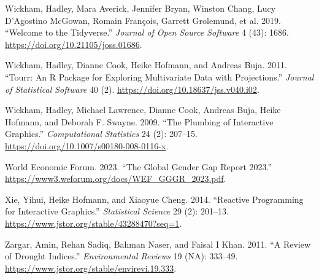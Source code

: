 \documentclass[
]{interact}
\newlength{\cslhangindent}
\newlength{\cslentryspacingunit} %
\newenvironment{CSLReferences}[2] %
 {%
  \setlength{\parindent}{0pt}
  \ifodd #1
  \let\oldpar\par
  \def\par{\hangindent=\cslhangindent\oldpar}
  \fi
  \setlength{\parskip}{#2\cslentryspacingunit}
 }%
 {}
\begin{document}
\begin{CSLReferences}{1}{0}
\leavevmode{}%
Wickham, Hadley, Mara Averick, Jennifer Bryan, Winston Chang, Lucy
D'Agostino McGowan, Romain François, Garrett Grolemund, et al. 2019.
{``Welcome to the {Tidyverse}.''} \emph{Journal of Open Source Software}
4 (43): 1686. \url{https://doi.org/10.21105/joss.01686}.

\leavevmode{}%
Wickham, Hadley, Dianne Cook, Heike Hofmann, and Andreas Buja. 2011.
{``Tourr: {An} {R} {Package} for {Exploring} {Multivariate} {Data} with
{Projections}.''} \emph{Journal of Statistical Software} 40 (2).
\url{https://doi.org/10.18637/jss.v040.i02}.

\leavevmode{}%
Wickham, Hadley, Michael Lawrence, Dianne Cook, Andreas Buja, Heike
Hofmann, and Deborah F. Swayne. 2009. {``The Plumbing of Interactive
Graphics.''} \emph{Computational Statistics} 24 (2): 207--15.
\url{https://doi.org/10.1007/s00180-008-0116-x}.

\leavevmode{}%
World Economic Forum. 2023. {``{The Global Gender Gap Report 2023}.''}
\url{https://www3.weforum.org/docs/WEF_GGGR_2023.pdf}.

\leavevmode{}%
Xie, Yihui, Heike Hofmann, and Xiaoyue Cheng. 2014. {``Reactive
{Programming} for {Interactive} {Graphics}.''} \emph{Statistical
Science} 29 (2): 201--13.
\url{https://www.jstor.org/stable/43288470?seq=1}.

\leavevmode{}%
Zargar, Amin, Rehan Sadiq, Bahman Naser, and Faisal I Khan. 2011. {``A
Review of Drought Indices.''} \emph{Environmental Reviews} 19 (NA):
333--49. \url{https://www.jstor.org/stable/envirevi.19.333}.

\end{CSLReferences}
\end{document}
